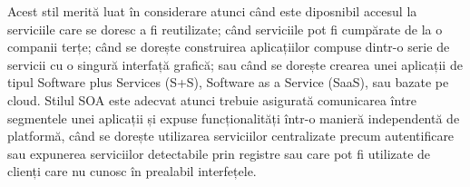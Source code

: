 \documentclass[12pt, a4paper, oneside, romanian]{teza-upb}
\begin{document}
Acest stil merită luat în considerare atunci când este diposnibil accesul la serviciile care se doresc a fi reutilizate; când serviciile pot fi cumpărate de la o companii terțe; când se dorește construirea aplicațiilor compuse dintr-o serie de servicii cu o singură interfață grafică; sau când se dorește crearea unei aplicații de tipul Software plus Services (S+S), Software as a Service (SaaS), sau bazate pe cloud. Stilul SOA este adecvat atunci trebuie asigurată comunicarea între segmentele unei aplicații și expuse funcționalități într-o manieră independentă de platformă, când se dorește utilizarea serviciilor centralizate precum autentificare sau expunerea serviciilor detectabile prin registre sau care pot fi utilizate de clienți care nu cunosc în prealabil interfețele.
\end{document}
